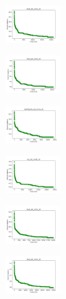 \begin{figure}[H]
\begin{subfigure}
        \centering
        \includegraphics[width=0.234\textwidth]{img/hs/ecoli_set_const_10_589741062_cost.png}
    \end{subfigure}
    \hfill
    \begin{subfigure}
        \centering
        \includegraphics[width=0.234\textwidth]{img/hs/rand_set_const_10_589741062_cost.png}
    \end{subfigure}
    \hfill
    \begin{subfigure}
        \centering
        \includegraphics[width=0.234\textwidth]{img/hs/newthyroid_set_const_10_589741062_cost.png}
    \end{subfigure}
    \hfill
    \begin{subfigure}
        \centering
        \includegraphics[width=0.234\textwidth]{img/hs/iris_set_const_10_277451237_cost.png}
    \end{subfigure}
    \hfill
    \begin{subfigure}
        \centering
        \includegraphics[width=0.234\textwidth]{img/hs/ecoli_set_const_10_277451237_cost.png}
    \end{subfigure}
    \hfill
    \begin{subfigure}
        \centering
        \includegraphics[width=0.234\textwidth]{img/hs/rand_set_const_10_277451237_cost.png}

\end{subfigure}
\end{figure}

